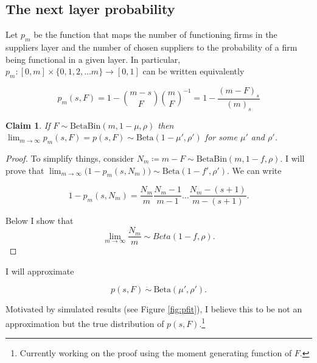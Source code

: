 \documentclass[american, abstract=on]{scrartcl}
\theoremstyle{plain}
\newtheorem{claim}{Claim}
\newcommand{\Beta}{\text{Beta}}
\newcommand{\Bin}{\text{Bin}}
\begin{document}
\subsection{The next layer probability}

Let $p_m$ be the function that maps the number of functioning firms in the suppliers layer and the number of chosen suppliers to the probability of a firm being functional in a given layer. In particular, $p_m: [0, m] \times \{0, 1, 2, \ldots m\} \to [0, 1]$ can be written equivalently

\begin{equation}
    p_m(s, F) = 1 - \binom{m - s}{F} \binom{m}{F}^{-1} = 1 - \frac{(m - F)_s}{(m)_s}
\end{equation}

\begin{claim}
    If $F \sim \Beta\Bin(m, 1 - \mu, \rho)$ then $\lim_{m \rightarrow \infty} p_m(s, F) = p(s, F) \sim \Beta(1 - \mu', \rho')$ for some $\mu'$ and $\rho'$.
\end{claim}

\begin{proof}
    
    To simplify things, consider $N_m \coloneqq m - F \sim \Beta\Bin(m, 1 - f, \rho)$. I will prove that $\lim_{m \rightarrow \infty} \big( 1 - p_m(s, N_m) \big) \sim \Beta(1 - f', \rho')$. We can write

    \begin{equation}
        1 - p_m(s, N_m) = \frac{N_m}{m} \frac{N_m - 1}{m - 1} \ldots \frac{N_m - (s + 1)}{m - (s + 1)}.        
    \end{equation}

    Below I show that \begin{equation}
        \lim_{m \rightarrow \infty} \frac{N_m}{m} \sim Beta(1 - f, \rho).
    \end{equation}


\end{proof}

I will approximate

\begin{equation}
    p(s, F) \ \dot{\sim} \ \Beta(\mu', \rho').
\end{equation}

Motivated by simulated results (see Figure \ref{fig:pfit}), I believe this to be not an approximation but the true distribution of $p(s, F)$.\footnote{Currently working on the proof using the moment generating function of $F$.}
\end{document}
